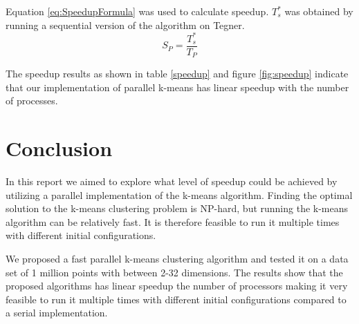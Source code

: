 \documentclass[parskip=true]{scrartcl}
\begin{document}
Equation \ref{eq:SpeedupFormula} was used to calculate speedup. $T^*_s$ was obtained by running a sequential version of the algorithm on Tegner.
\begin{equation} 
\label{eq:SpeedupFormula}
S_P = \frac{T^*_s}{T_P}
\end{equation}

The speedup results as shown in table \ref{speedup} and figure \ref{fig:speedup} indicate that our implementation of parallel k-means has linear speedup with the number of processes. 

\section{Conclusion}
In this report we aimed to explore what level of speedup could be achieved by utilizing a parallel implementation of the k-means algorithm. Finding the optimal solution to the k-means clustering problem is NP-hard, but running the k-means algorithm can be relatively fast. It is therefore feasible to run it multiple times with different initial configurations.

We proposed a fast parallel k-means clustering algorithm and tested it on a data set of 1 million points with between 2-32 dimensions. The results show that the proposed algorithms has linear speedup the number of processors making it very feasible to run it multiple times with different initial configurations compared to a serial implementation.


\vfill

\end{document}
